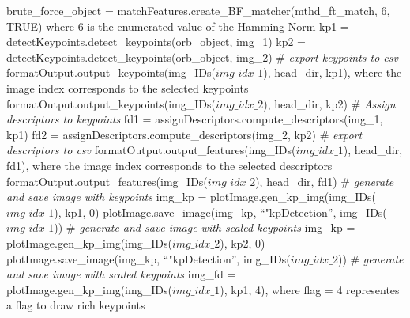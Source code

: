 \documentclass[12pt, titlepage]{article}
\begin{document}
brute\_force\_object = matchFeatures.create\_BF\_matcher(mthd\_ft\_match, 6, TRUE) where 6 is the enumerated value of the Hamming Norm \newline
kp1 = detectKeypoints.detect\_keypoints(orb\_object, img\_1)\newline 
kp2 = detectKeypoints.detect\_keypoints(orb\_object, img\_2)\newline \newline
\# \textit{export keypoints to csv} \newline 
formatOutput.output\_keypoints(img\_IDs($img\_idx\_{1}$), head\_dir, kp1), where the image index corresponds to the selected keypoints \newline
formatOutput.output\_keypoints(img\_IDs($img\_idx\_{2}$), head\_dir, kp2) \newline \newline
\# \textit{Assign descriptors to keypoints} \newline 
fd1 = assignDescriptors.compute\_descriptors(img\_1, kp1)\newline 
fd2 = assignDescriptors.compute\_descriptors(img\_2, kp2)\newline \newline
\# \textit{export descriptors to csv} \newline
formatOutput.output\_features(img\_IDs($img\_idx\_{1}$), head\_dir, fd1), where the image index corresponds to the selected descriptors \newline
formatOutput.output\_features(img\_IDs($img\_idx\_{2}$), head\_dir, fd1) \newline \newline
\# \textit{generate and save image with keypoints} \newline 
img\_kp = plotImage.gen\_kp\_img(img\_IDs($img\_idx\_{1}$), kp1, 0)\newline
plotImage.save\_image(img\_kp, ``"kpDetection'', img\_IDs($img\_idx\_{1}$))\newline \newline
\# \textit{generate and save image with scaled keypoints} \newline 
img\_kp = plotImage.gen\_kp\_img(img\_IDs($img\_idx\_{2}$), kp2, 0)\newline
plotImage.save\_image(img\_kp, ``"kpDetection'', img\_IDs($img\_idx\_{2}$))\newline \newline
\# \textit{generate and save image with scaled keypoints} \newline
img\_fd = plotImage.gen\_kp\_img(img\_IDs($img\_idx\_{1}$), kp1, 4), where flag = 4 representes a flag to draw rich keypoints\newline
\end{document}
